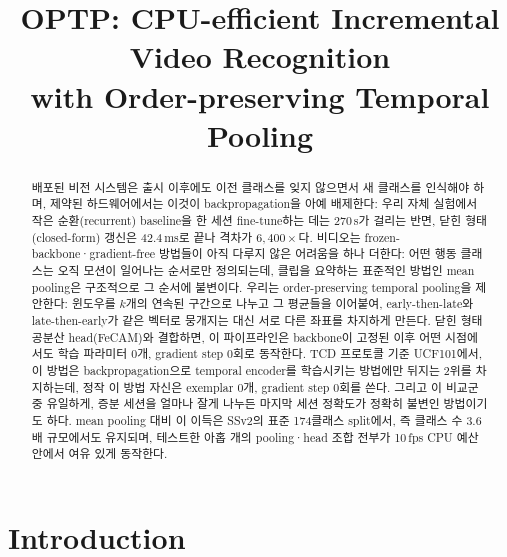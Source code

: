 \documentclass[11pt]{article}
\title{OPTP: CPU-efficient Incremental Video Recognition\\ with Order-preserving Temporal Pooling}
\author{}
\date{}
\begin{document}
\maketitle

\begin{abstract}
배포된 비전 시스템은 출시 이후에도 이전 클래스를 잊지 않으면서 새
클래스를 인식해야 하며, 제약된 하드웨어에서는 이것이 backpropagation을
아예 배제한다: 우리 자체 실험에서 작은 순환(recurrent) baseline을 한
세션 fine-tune하는 데는 270\,s가 걸리는 반면, 닫힌 형태(closed-form)
갱신은 42.4\,ms로 끝나 격차가 $6{,}400\times$다. 비디오는
frozen-backbone·gradient-free 방법들이 아직 다루지 않은 어려움을 하나
더한다: 어떤 행동 클래스는 오직 모션이 일어나는 순서로만 정의되는데,
클립을 요약하는 표준적인 방법인 mean pooling은 구조적으로 그 순서에
불변이다. 우리는 order-preserving temporal pooling을 제안한다: 윈도우를
$k$개의 연속된 구간으로 나누고 그 평균들을 이어붙여, early-then-late와
late-then-early가 같은 벡터로 뭉개지는 대신 서로 다른 좌표를 차지하게
만든다. 닫힌 형태 공분산 head(FeCAM)와 결합하면, 이 파이프라인은
backbone이 고정된 이후 어떤 시점에서도 학습 파라미터 0개, gradient step
0회로 동작한다. TCD 프로토콜 기준 UCF101에서, 이 방법은
backpropagation으로 temporal encoder를 학습시키는 방법에만 뒤지는 2위를
차지하는데, 정작 이 방법 자신은 exemplar 0개, gradient step 0회를 쓴다.
그리고 이 비교군 중 유일하게, 증분 세션을 얼마나 잘게 나누든 마지막
세션 정확도가 정확히 불변인 방법이기도 하다. mean pooling 대비 이 이득은 SSv2의 표준
174클래스 split에서, 즉 클래스 수 $3.6$배 규모에서도 유지되며,
테스트한 아홉 개의 pooling·head 조합 전부가 10\,fps CPU 예산 안에서
여유 있게 동작한다.
\end{abstract}

\section{Introduction}
\label{sec:intro}
\end{document}
